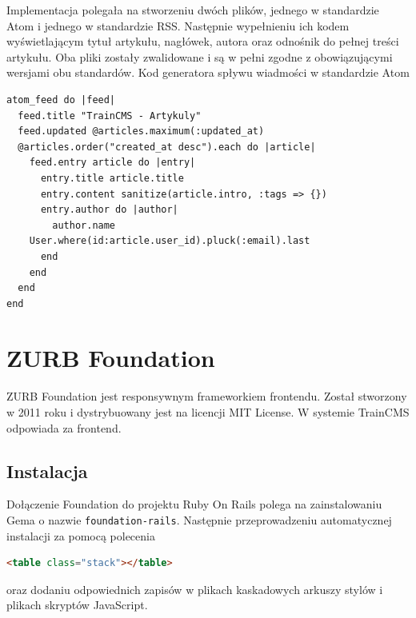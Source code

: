 \documentclass[openright]{xmgr}
\begin{document}
Implementacja polegała na stworzeniu dwóch plików, jednego w standardzie Atom i jednego w standardzie RSS. Następnie wypełnieniu ich kodem wyświetlającym tytuł artykułu, nagłówek, autora oraz odnośnik do pełnej treści artykułu. Oba pliki zostały zwalidowane i są w pełni zgodne z obowiązującymi wersjami obu standardów.
Kod generatora spływu wiadmości w standardzie Atom

\begin{lstlisting}[language=ruby2, caption={Kod generatora spływu wiadmości w standardzie Atom}]
atom_feed do |feed|
  feed.title "TrainCMS - Artykuly"
  feed.updated @articles.maximum(:updated_at)
  @articles.order("created_at desc").each do |article|
    feed.entry article do |entry|
      entry.title article.title
      entry.content sanitize(article.intro, :tags => {})
      entry.author do |author|
        author.name 
	User.where(id:article.user_id).pluck(:email).last
      end
    end
  end
end
\end{lstlisting}

\newpage

\section{ZURB Foundation}
ZURB Foundation \cite{foundation} jest responsywnym frameworkiem frontendu. Został stworzony w 2011 roku i dystrybuowany jest na licencji MIT License. W systemie \mbox{TrainCMS} odpowiada za frontend. 

\subsection{Instalacja}
Dołączenie Foundation do projektu Ruby On Rails polega na zainstalowaniu Gema o nazwie \texttt{foundation-rails}. Następnie przeprowadzeniu automatycznej instalacji za pomocą polecenia 
\begin{lstlisting}[language=html, caption={Przykładowa tabela}]
<table class="stack"></table>
\end{lstlisting}
oraz dodaniu odpowiednich zapisów w plikach kaskadowych arkuszy stylów i plikach skryptów JavaScript.
\end{document}
